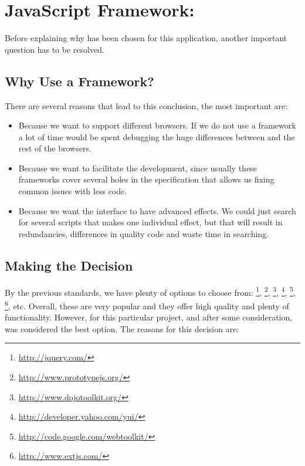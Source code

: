 \section{JavaScript Framework: } %
\label{sec:mootools}

Before explaining why  has been chosen for this application, another important question has to be resolved.

\subsection{Why Use a  Framework?} %
\label{sub:whymootools}

There are several reasons that lead to this conclusion, the most important are:

\begin{itemize}

  \item Because we want to support different browsers.
  If we do not use a framework a lot of time would be spent debugging the huge differences between  and the rest of the browsers.

  \item Because we want to facilitate the development, since usually these frameworks cover several holes in the  specification that allows us fixing common issues with less code.

  \item Because we want the interface to have advanced effects.
  We could just search for several scripts that makes one individual effect, but that will result in redundancies, differences in quality code and waste time in searching.

\end{itemize}


\subsection{Making the Decision} %
\label{sub:decision}

By the previous standards, we have plenty of options to choose from:
\footnote{\url{http://jquery.com/}},
\footnote{\url{http://www.prototypejs.org/}},
\footnote{\url{http://www.dojotoolkit.org/}},
\footnote{\url{http://developer.yahoo.com/yui/}},
\footnote{\url{http://code.google.com/webtoolkit/}},
\footnote{\url{http://www.extjs.com/}}, etc.
Overall, these are very popular and they offer high quality and plenty of functionality.
However, for this particular project, and after some consideration,  \cite{MooTools} was considered the best option.
The reasons for this decision are:

